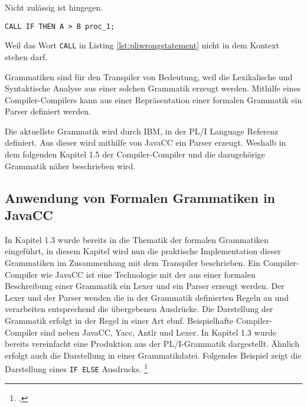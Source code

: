 Nicht zulässig ist hingegen.

\begin{lstlisting}[language=PL/I, caption=Wrong Statement PL/I, label={lst:pliwrongstatement}]
CALL IF THEN A > B proc_1;
\end{lstlisting}

Weil das Wort \verb+CALL+ in Listing \ref{lst:pliwrongstatement} nicht in dem Kontext stehen darf.

	
Grammatiken sind für den Transpiler von Bedeutung, weil die Lexikalische und Syntaktische Analyse aus einer solchen Grammatik erzeugt werden. Mithilfe eines Compiler-Compilers kann aus einer Repräsentation einer formalen Grammatik ein Parser definiert werden.
 
Die aktuellste Grammatik wird durch IBM, in der PL/I Language Referenz definiert. Aus dieser wird mithilfe von JavaCC ein Parser erzeugt. Weshalb in dem folgenden Kapitel 1.5 der Compiler-Compiler und die dazugehörige Grammatik näher beschrieben wird.

     
\subsection{Anwendung von Formalen Grammatiken in JavaCC}

In Kapitel 1.3 wurde bereits in die Thematik der formalen Grammatiken eingeführt, in diesem Kapitel wird nun die praktische Implementation dieser Grammatiken im Zusammenhang mit dem Transpiler beschrieben.
Ein Compiler-Compiler wie JavaCC ist eine Technologie mit der aus einer formalen Beschreibung einer Grammatik ein Lexer und ein Parser erzeugt werden. 
Der Lexer und der Parser wenden die in der Grammatik definierten Regeln an und verarbeiten entsprechend die übergebenen Ausdrücke.
Die Darstellung der Grammatik erfolgt in der Regel in einer Art \ac{ebnf}. 
Beispielhafte Compiler-Compiler sind neben JavaCC, Yacc, Antlr und Lexer.
In Kapitel 1.3 wurde bereits vereinfacht eine Produktion aus der PL/I-Grammatik dargestellt. Ähnlich erfolgt auch die Darstellung in einer Grammatikdatei. Folgendes Beispiel zeigt die Darstellung eines \verb+IF ELSE+ Ausdrucks. 
\footcite[Vgl. ][]{javaccdoku}


